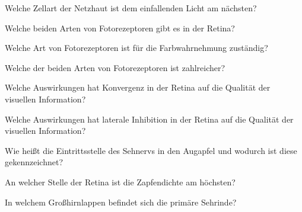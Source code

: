 \documentclass[10pt, a4paper]{exam}
\begin{document}
\begin{questions}
\begin{solution}
  \end{solution}

  \question Welche Zellart der Netzhaut ist dem einfallenden Licht am nächsten?
  \begin{solution}

  \end{solution}

  \question Welche beiden Arten von Fotorezeptoren gibt es in der Retina?
  \begin{solution}

  \end{solution}

  \question Welche Art von Fotorezeptoren ist für die Farbwahrnehmung zuständig?
  \begin{solution}

  \end{solution}

  \question Welche der beiden Arten von Fotorezeptoren ist zahlreicher?
  \begin{solution}

  \end{solution}

  \question Welche Auswirkungen hat Konvergenz in der Retina auf die Qualität der visuellen Information?
  \begin{solution}

  \end{solution}

  \question Welche Auswirkungen hat laterale Inhibition in der Retina auf die Qualität der visuellen Information?
  \begin{solution}

  \end{solution}

  \question Wie heißt die Eintrittsstelle des Sehnervs in den Augapfel und wodurch ist diese gekennzeichnet?
  \begin{solution}

  \end{solution}

  \question An welcher Stelle der Retina ist die Zapfendichte am höchsten?
  \begin{solution}

  \end{solution}

  \question In welchem Großhirnlappen befindet sich die primäre Sehrinde?
  \begin{solution}

  \end{solution}


\end{questions}
\end{document}
